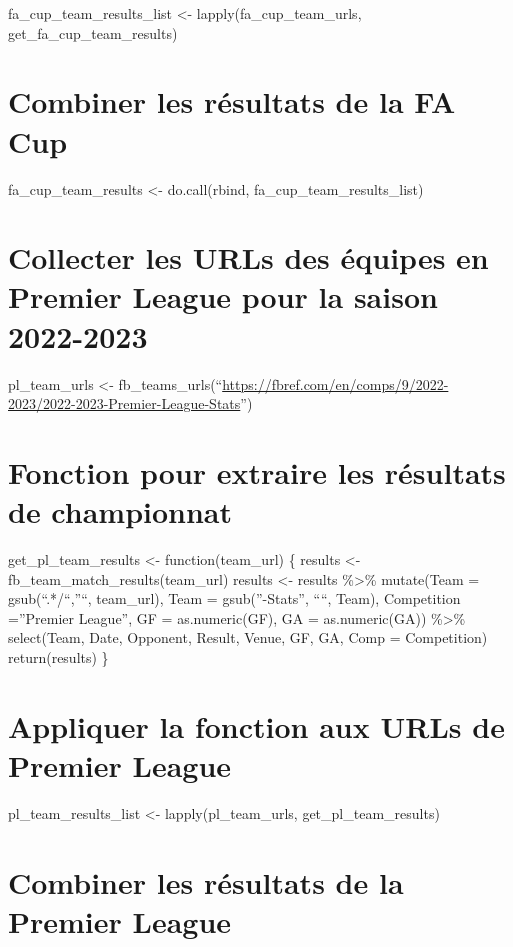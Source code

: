 \documentclass[
]{article}
\begin{document}
fa\_cup\_team\_results\_list \textless- lapply(fa\_cup\_team\_urls,
get\_fa\_cup\_team\_results)

\section{Combiner les résultats de la FA
Cup}\label{combiner-les-ruxe9sultats-de-la-fa-cup}

fa\_cup\_team\_results \textless- do.call(rbind,
fa\_cup\_team\_results\_list)

\section{Collecter les URLs des équipes en Premier League pour la saison
2022-2023}\label{collecter-les-urls-des-uxe9quipes-en-premier-league-pour-la-saison-2022-2023}

pl\_team\_urls \textless-
fb\_teams\_urls(``\url{https://fbref.com/en/comps/9/2022-2023/2022-2023-Premier-League-Stats}'')

\section{Fonction pour extraire les résultats de
championnat}\label{fonction-pour-extraire-les-ruxe9sultats-de-championnat}

get\_pl\_team\_results \textless- function(team\_url) \{ results
\textless- fb\_team\_match\_results(team\_url) results \textless-
results \%\textgreater\% mutate(Team = gsub(``.*/``,''``, team\_url),
Team = gsub(''-Stats'', ````, Team), Competition =''Premier League'', GF
= as.numeric(GF), GA = as.numeric(GA)) \%\textgreater\% select(Team,
Date, Opponent, Result, Venue, GF, GA, Comp = Competition)
return(results) \}

\section{Appliquer la fonction aux URLs de Premier
League}\label{appliquer-la-fonction-aux-urls-de-premier-league}

pl\_team\_results\_list \textless- lapply(pl\_team\_urls,
get\_pl\_team\_results)

\section{Combiner les résultats de la Premier
League}\label{combiner-les-ruxe9sultats-de-la-premier-league}
\end{document}
